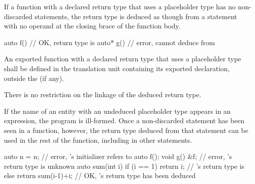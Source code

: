 \pnum
If a function with a declared return type that uses a placeholder type has no
non-discarded  statements, the return type is deduced as though from a
 statement with no operand at the closing brace of the function
body.
\begin{example}
\begin{codeblock}
auto  f() { }                   // OK, return type is 
auto* g() { }                   // error, cannot deduce  from 
\end{codeblock}
\end{example}

\pnum
An exported function
with a declared return type that uses a placeholder type
shall be defined in the translation unit
containing its exported declaration,
outside the  (if any).
\begin{note}
There is no restriction on the linkage of
the deduced return type.
\end{note}

\pnum
If the name of an entity with an undeduced placeholder type appears in an
expression, the program is ill-formed.  Once a
non-discarded  statement has been seen in a function, however, the return type deduced
from that statement can be used in the rest of the function, including in other
 statements.
\begin{example}
\begin{codeblock}
auto n = n;                     // error, 's initializer refers to 
auto f();
void g() { &f; }                // error, 's return type is unknown
auto sum(int i) {
  if (i == 1)
    return i;                   // 's return type is 
  else
    return sum(i-1)+i;          // OK, 's return type has been deduced
}
\end{codeblock}
\end{example}

